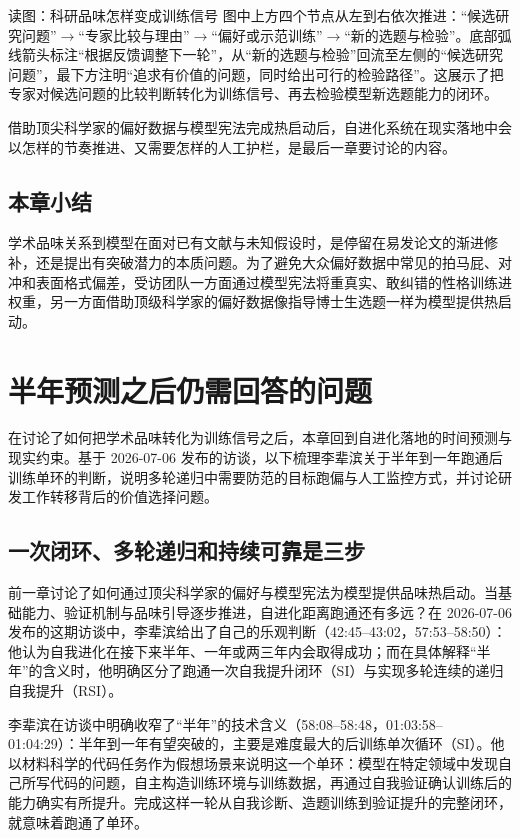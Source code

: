 \documentclass[UTF8,a4paper,11pt,fontset=fandol]{ctexart}
\begin{document}
\begin{knowledgebox}{读图：科研品味怎样变成训练信号}
图中上方四个节点从左到右依次推进：“候选研究问题”\ensuremath{\rightarrow}“专家比较与理由”\ensuremath{\rightarrow}“偏好或示范训练”\ensuremath{\rightarrow}“新的选题与检验”。底部弧线箭头标注“根据反馈调整下一轮”，从“新的选题与检验”回流至左侧的“候选研究问题”，最下方注明“追求有价值的问题，同时给出可行的检验路径”。这展示了把专家对候选问题的比较判断转化为训练信号、再去检验模型新选题能力的闭环。
\end{knowledgebox}
借助顶尖科学家的偏好数据与模型宪法完成热启动后，自进化系统在现实落地中会以怎样的节奏推进、又需要怎样的人工护栏，是最后一章要讨论的内容。
\subsection{本章小结}
学术品味关系到模型在面对已有文献与未知假设时，是停留在易发论文的渐进修补，还是提出有突破潜力的本质问题。为了避免大众偏好数据中常见的拍马屁、对冲和表面格式偏差，受访团队一方面通过模型宪法将重真实、敢纠错的性格训练进权重，另一方面借助顶级科学家的偏好数据像指导博士生选题一样为模型提供热启动。
\section{半年预测之后仍需回答的问题}
在讨论了如何把学术品味转化为训练信号之后，本章回到自进化落地的时间预测与现实约束。基于 2026-07-06 发布的访谈，以下梳理李辈滨关于半年到一年跑通后训练单环的判断，说明多轮递归中需要防范的目标跑偏与人工监控方式，并讨论研发工作转移背后的价值选择问题。
\subsection{一次闭环、多轮递归和持续可靠是三步}
前一章讨论了如何通过顶尖科学家的偏好与模型宪法为模型提供品味热启动。当基础能力、验证机制与品味引导逐步推进，自进化距离跑通还有多远？在 2026-07-06 发布的这期访谈中，李辈滨给出了自己的乐观判断（42:45–43:02，57:53–58:50）：他认为自我进化在接下来半年、一年或两三年内会取得成功；而在具体解释“半年”的含义时，他明确区分了跑通一次自我提升闭环（SI）与实现多轮连续的递归自我提升（RSI）。

李辈滨在访谈中明确收窄了“半年”的技术含义（58:08–58:48，01:03:58–01:04:29）：半年到一年有望突破的，主要是难度最大的后训练单次循环（SI）。他以材料科学的代码任务作为假想场景来说明这一个单环：模型在特定领域中发现自己所写代码的问题，自主构造训练环境与训练数据，再通过自我验证确认训练后的能力确实有所提升。完成这样一轮从自我诊断、造题训练到验证提升的完整闭环，就意味着跑通了单环。
\end{document}
